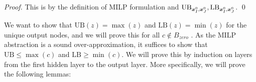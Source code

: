 			\begin{proof}
				This is by the definition of MILP formulation and $\mathrm{UB}_{\boldsymbol{x}^0_I,\boldsymbol{x}^0_J}, \mathrm{LB}_{\boldsymbol{x}^0_I,\boldsymbol{x}^0_J}$. \qed
			\end{proof}
			
			
			
			We want to show that $\mathrm{UB}(z) = \max (z)$ and $\mathrm{LB}(z) = \min (z)$ for the unique output nodes, and we will prove this for all $c\notin B_{zero}$ . As the MILP abstraction is a sound over-approximation, 
			it suffices to show that $\mathrm{UB}\leq \max (c)$ and $\mathrm{LB} \geq \min (c)$. We will prove this by induction on layers from the first hidden layer to the output layer. More specifically, we will prove the following lemmas:
			
